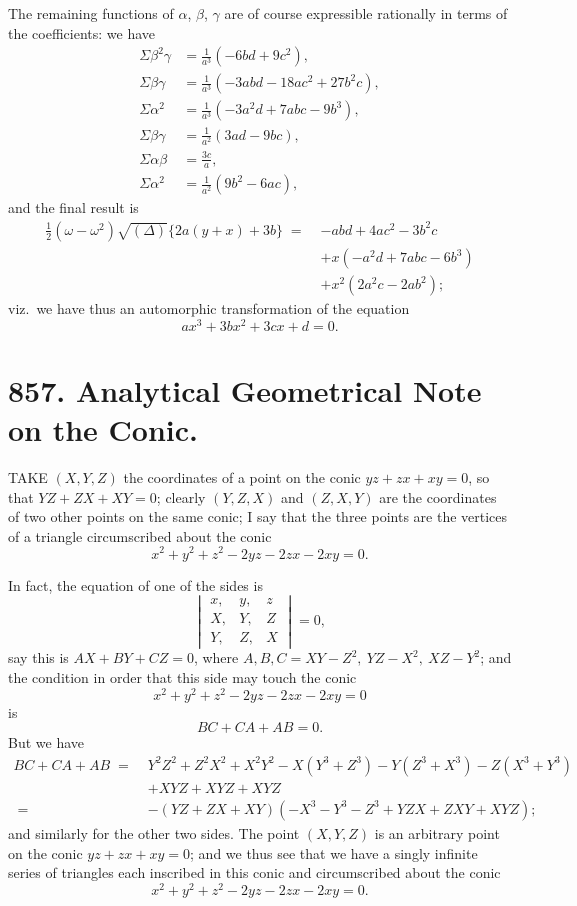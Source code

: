 \documentclass[11pt]{article}
\begin{document}
The remaining functions of $\alpha$, $\beta$, $\gamma$ are of course expressible rationally in terms of the coefficients: we have
\begin{align*}
\Sigma\beta^2\gamma &= \tfrac{1}{a^3}(-6bd + 9c^2),\\
\Sigma\beta\gamma &= \tfrac{1}{a^3}(-3abd - 18ac^2 + 27b^2 c),\\
\Sigma\alpha^2 &= \tfrac{1}{a^3}(-3a^2 d + 7abc - 9b^3),\\
\Sigma\beta\gamma &= \tfrac{1}{a^2}(3ad - 9bc),\\
\Sigma\alpha\beta &= \tfrac{3c}{a},\\
\Sigma\alpha^2 &= \tfrac{1}{a^2}(9b^2 - 6ac),
\end{align*}
and the final result is
\begin{align*}
\tfrac{1}{2}(\omega - \omega^2)\sqrt{(\Delta)}\bigl\{2a(y+x) + 3b\bigr\} \;=\; & -abd + 4ac^2 - 3b^2c\\
& + x(-a^2 d + 7abc - 6b^3)\\
& + x^2(2a^2 c - 2ab^2);
\end{align*}
viz.\ we have thus an automorphic transformation of the equation
\[
ax^3 + 3bx^2 + 3cx + d = 0.
\]

\vfill

\newpage

\section*{857. Analytical Geometrical Note on the Conic.}


\medskip

\noindent TAKE $(X, Y, Z)$ the coordinates of a point on the conic $yz + zx + xy = 0$, so that $YZ + ZX + XY = 0$; clearly $(Y, Z, X)$ and $(Z, X, Y)$ are the coordinates of two other points on the same conic; I say that the three points are the vertices of a triangle circumscribed about the conic
\[
x^2 + y^2 + z^2 - 2yz - 2zx - 2xy = 0.
\]

In fact, the equation of one of the sides is
\[
\begin{vmatrix} x, & y, & z\\ X, & Y, & Z\\ Y, & Z, & X \end{vmatrix} = 0,
\]
say this is $AX + BY + CZ = 0$, where $A, B, C = XY - Z^2,\ YZ - X^2,\ XZ - Y^2$; and the condition in order that this side may touch the conic
\[
x^2 + y^2 + z^2 - 2yz - 2zx - 2xy = 0
\]
is
\[
BC + CA + AB = 0.
\]
But we have
\begin{align*}
BC + CA + AB \;=\; & Y^2 Z^2 + Z^2 X^2 + X^2 Y^2 - X(Y^3 + Z^3) - Y(Z^3 + X^3) - Z(X^3 + Y^3)\\
& + XYZ + XYZ + XYZ\\
\;=\; & -(YZ + ZX + XY)\!\left(-X^3 - Y^3 - Z^3 + YZX + ZXY + XYZ\right);
\end{align*}
and similarly for the other two sides. The point $(X, Y, Z)$ is an arbitrary point on the conic $yz + zx + xy = 0$; and we thus see that we have a singly infinite series of triangles each inscribed in this conic and circumscribed about the conic
\[
x^2 + y^2 + z^2 - 2yz - 2zx - 2xy = 0.
\]
\end{document}

